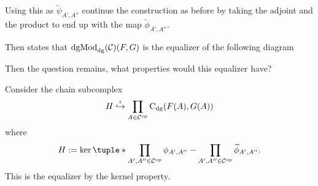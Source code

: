 \begin{remark}
\begin{center}
    \end{center}
    Using this as \( \widetilde{\psi}_{A', A''} \) continue the construction as before by taking the adjoint and the product to end up with the map \( \widetilde{\phi}_{A', A''} \).

    Then \cite[Proposition 6.3.1]{Borceux_1994} states that \( \operatorname{dgMod}_{\operatorname{dg}}({\mathcal{C}})(F, G) \) is the equalizer of the following diagram
    \begin{center}
    \end{center}
    Then the question remains, what properties would this equalizer have?
    
    Consider the chain subcomplex
    \[
        H \stackrel{\iota}{\hookrightarrow} \prod_{A \in {\mathcal{C}}^{\operatorname{op}}} \operatorname{C}_{\operatorname{dg}}(F(A), G(A))
    \]
    where
    \[
        H := \ker\tuple*{\prod\limits_{A', A'' \in \Cc^{\op}} \phi_{A', A''} - \prod_{A', A'' \in \Cc^{\op}} \widetilde{\phi}_{A', A''}}.
    \]
    This is the equalizer by the kernel property.


\end{remark}
